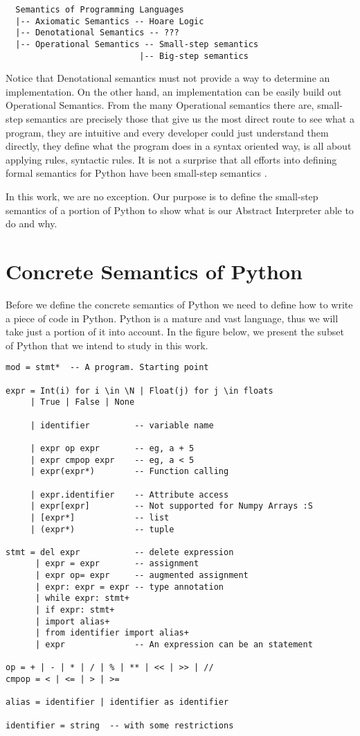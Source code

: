 \begin{verbatim}
  Semantics of Programming Languages
  |-- Axiomatic Semantics -- Hoare Logic
  |-- Denotational Semantics -- ???
  |-- Operational Semantics -- Small-step semantics
                           |-- Big-step semantics
\end{verbatim}

Notice that Denotational semantics must not provide a way to determine an implementation.
On the other hand, an implementation can be easily build out Operational Semantics.
From the many Operational semantics there are, small-step semantics are precisely those
that give us the most direct route to see what a program, they are intuitive and every
developer could just understand them directly, they define what the program does in a
syntax oriented way, is all about applying rules, syntactic rules. It is not a surprise
that all efforts into defining formal semantics for Python have been small-step semantics
.

In this work, we are no exception. Our purpose is to define the small-step semantics of a
portion of Python to show what is our Abstract Interpreter able to do and why.

\section{Concrete Semantics of Python}

Before we define the concrete semantics of Python we need to define how to write a piece
of code in Python. Python is a mature and vast language, thus we will take just a portion
of it into account. In the figure below, we present the subset of Python that we intend to
study in this work.

\begin{verbatim}
mod = stmt*  -- A program. Starting point

expr = Int(i) for i \in \N | Float(j) for j \in floats
     | True | False | None

     | identifier         -- variable name

     | expr op expr       -- eg, a + 5
     | expr cmpop expr    -- eg, a < 5
     | expr(expr*)        -- Function calling

     | expr.identifier    -- Attribute access
     | expr[expr]         -- Not supported for Numpy Arrays :S
     | [expr*]            -- list
     | (expr*)            -- tuple

stmt = del expr           -- delete expression
      | expr = expr       -- assignment
      | expr op= expr     -- augmented assignment
      | expr: expr = expr -- type annotation
      | while expr: stmt+
      | if expr: stmt+
      | import alias+
      | from identifier import alias+
      | expr              -- An expression can be an statement

op = + | - | * | / | % | ** | << | >> | //
cmpop = < | <= | > | >=

alias = identifier | identifier as identifier

identifier = string  -- with some restrictions
\end{verbatim}

